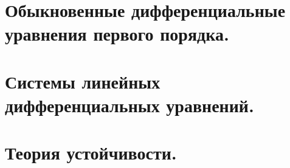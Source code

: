 \documentclass[fleqn, 12pt, a4paper, titlepage]{extarticle}
\begin{document}

		
		\parindent=0pt
		\RaggedRight

		
		\section*{Обыкновенные дифференциальные уравнения первого порядка.}
		

		
		\section*{Системы линейных дифференциальных уравнений.}
		

		
		\section*{Теория устойчивости.}
		

		
\end{document}

